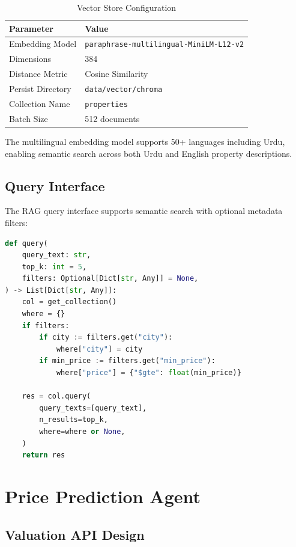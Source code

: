 \begin{table}[!htbp]
\centering
\caption{Vector Store Configuration}
\label{tab:vector-config}
\begin{tabular}{|l|l|}
\hline
\textbf{Parameter} & \textbf{Value} \\ \hline
Embedding Model & \texttt{paraphrase-multilingual-MiniLM-L12-v2} \\ \hline
Dimensions & 384 \\ \hline
Distance Metric & Cosine Similarity \\ \hline
Persist Directory & \texttt{data/vector/chroma} \\ \hline
Collection Name & \texttt{properties} \\ \hline
Batch Size & 512 documents \\ \hline
\end{tabular}
\end{table}

The multilingual embedding model supports 50+ languages including Urdu, enabling semantic search across both Urdu and English property descriptions.

\subsection{Query Interface}

The RAG query interface supports semantic search with optional metadata filters:

\begin{lstlisting}[language=Python, caption={RAG Query Interface}, label=lst:rag-query]
def query(
    query_text: str,
    top_k: int = 5,
    filters: Optional[Dict[str, Any]] = None,
) -> List[Dict[str, Any]]:
    col = get_collection()
    where = {}
    if filters:
        if city := filters.get("city"):
            where["city"] = city
        if min_price := filters.get("min_price"):
            where["price"] = {"$gte": float(min_price)}
    
    res = col.query(
        query_texts=[query_text],
        n_results=top_k,
        where=where or None,
    )
    return res
\end{lstlisting}

\section{Price Prediction Agent}

\subsection{Valuation API Design}

